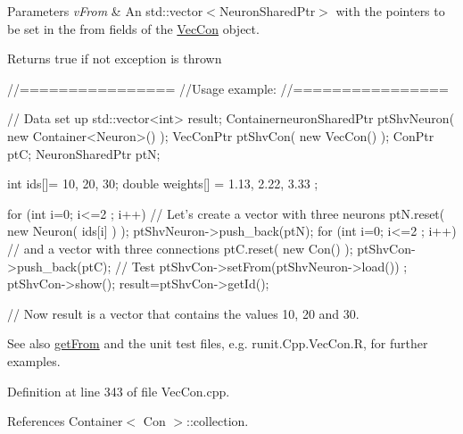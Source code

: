 \begin{DoxyParams}{Parameters}
{\em vFrom} & An std::vector$<$NeuronSharedPtr$>$ with the pointers to be set in the from fields of the \hyperlink{classvec_con}{VecCon} object.\\
\hline
\end{DoxyParams}
\begin{DoxyReturn}{Returns}
true if not exception is thrown
\end{DoxyReturn}

\begin{DoxyCode}
        //================
        //Usage example:
        //================

        // Data set up
                std::vector<int> result;
                ContainerneuronSharedPtr ptShvNeuron( new Container<Neuron>() );
                VecConPtr ptShvCon( new VecCon() );
                ConPtr    ptC;
                NeuronSharedPtr ptN;

                int ids[]= {10, 20, 30};
                double weights[] = {1.13, 2.22, 3.33 };

                for (int i=0; i<=2 ; i++) {                             // Let's 
      create a vector with three neurons
                        ptN.reset( new Neuron( ids[i] ) );
                        ptShvNeuron->push_back(ptN);
                }
                for (int i=0; i<=2 ; i++) {                             // and a 
      vector with three connections
                        ptC.reset( new Con() );
                        ptShvCon->push_back(ptC);
                }
        // Test
                ptShvCon->setFrom(ptShvNeuron->load()) ;
                ptShvCon->show();
                result=ptShvCon->getId();

        // Now result is a vector that contains the values 10, 20 and 30.
\end{DoxyCode}


\begin{DoxySeeAlso}{See also}
\hyperlink{classvec_con_ae72d00aedcd054e690f1dcf2ca5ac2c2}{getFrom} and the unit test files, e.g. runit.Cpp.VecCon.R, for further examples. 
\end{DoxySeeAlso}


Definition at line 343 of file VecCon.cpp.



References Container$<$ Con $>$::collection.


